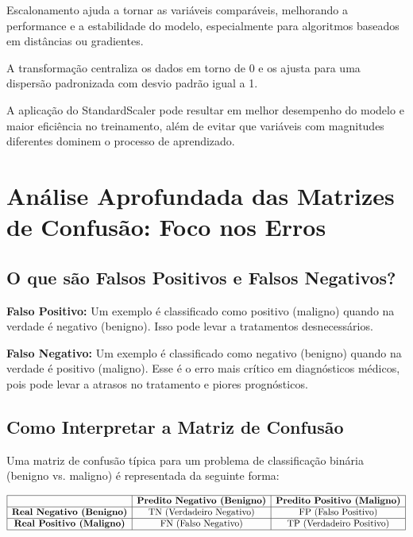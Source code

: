 \documentclass[12pt,a4paper,oneside,openany]{article}
\begin{document}
\noindent
Escalonamento ajuda a tornar as variáveis comparáveis, melhorando a performance e a estabilidade do modelo, especialmente para algoritmos baseados em distâncias ou gradientes.

\noindent
A transformação centraliza os dados em torno de 0 e os ajusta para uma dispersão padronizada com desvio padrão igual a 1.

\noindent
A aplicação do StandardScaler pode resultar em melhor desempenho do modelo e maior eficiência no treinamento, além de evitar que variáveis com magnitudes diferentes dominem o processo de aprendizado.

\section*{Análise Aprofundada das Matrizes de Confusão: Foco nos Erros}

\subsection*{O que são Falsos Positivos e Falsos Negativos?}

\noindent\textbf{Falso Positivo:} Um exemplo é classificado como positivo (maligno) quando na verdade é negativo (benigno). Isso pode levar a tratamentos desnecessários.

\noindent\textbf{Falso Negativo:} Um exemplo é classificado como negativo (benigno) quando na verdade é positivo (maligno). Esse é o erro mais crítico em diagnósticos médicos, pois pode levar a atrasos no tratamento e piores prognósticos.

\subsection*{Como Interpretar a Matriz de Confusão}

Uma matriz de confusão típica para um problema de classificação binária (benigno vs. maligno) é representada da seguinte forma:

\[
\begin{array}{|c|c|c|}
\hline
 & \textbf{Predito Negativo (Benigno)} & \textbf{Predito Positivo (Maligno)} \\
\hline
\textbf{Real Negativo (Benigno)} & \text{TN (Verdadeiro Negativo)} & \text{FP (Falso Positivo)} \\
\hline
\textbf{Real Positivo (Maligno)} & \text{FN (Falso Negativo)} & \text{TP (Verdadeiro Positivo)} \\
\hline
\end{array}
\]
\end{document}

